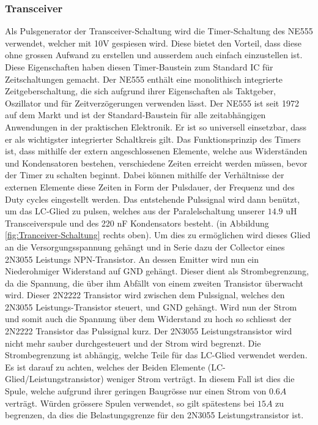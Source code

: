 \subsubsection*{Transceiver}
Als Pulsgenerator der Transceiver-Schaltung wird die Timer-Schaltung des NE555 verwendet, welcher mit 10V gespiesen wird. Diese bietet den Vorteil, dass diese ohne grossen Aufwand zu erstellen und ausserdem auch einfach einzustellen ist. Diese Eigenschaften haben diesen Timer-Baustein zum Standard IC für Zeitschaltungen gemacht. Der NE555 enthält eine monolithisch integrierte Zeitgeberschaltung, die sich aufgrund ihrer Eigenschaften als Taktgeber, Oszillator und für Zeitverzögerungen verwenden lässt. Der NE555 ist seit 1972 auf dem Markt und ist der Standard-Baustein für alle zeitabhängigen Anwendungen in der praktischen Elektronik. Er ist so universell einsetzbar, dass er als wichtigster integrierter Schaltkreis gilt. Das Funktionsprinzip des Timers ist, dass mithilfe der extern angeschlossenen Elemente, welche aus Widerständen und Kondensatoren bestehen, verschiedene Zeiten erreicht werden müssen, bevor der Timer zu schalten beginnt. Dabei können mithilfe der Verhältnisse der externen Elemente diese Zeiten in Form der Pulsdauer, der Frequenz und des Duty cycles eingestellt werden. Das entstehende Pulssignal wird dann benützt, um das LC-Glied zu pulsen, welches aus der Paralelschaltung unserer $14.9$ uH Transceiverspule und des 220 nF Kondensators besteht. (in Abbildung \ref{fig:Tranceiver-Schaltung} rechts oben). Um dies zu ermöglichen wird dieses Glied an die Versorgungsspannung gehängt und in Serie dazu der Collector eines 2N3055 Leistungs NPN-Transistor. An dessen Emitter wird nun ein Niederohmiger Widerstand auf GND gehängt. Dieser dient als Strombegrenzung, da die Spannung, die über ihm Abfällt von einem zweiten Transistor überwacht wird. Dieser 2N2222 Transistor wird zwischen dem Pulssignal, welches den 2N3055 Leistungs-Transistor steuert, und GND gehängt. Wird nun der Strom und somit auch die Spannung über dem Widerstand zu hoch so schliesst der 2N2222 Transistor das Pulssignal kurz. Der 2N3055 Leistungstransistor wird nicht mehr sauber durchgesteuert und der Strom wird begrenzt. Die Strombegrenzung ist abhängig, welche Teile für das LC-Glied verwendet werden. Es ist darauf zu achten, welches der Beiden Elemente (LC-Glied/Leistungstransistor) weniger Strom verträgt. In diesem Fall ist dies die Spule, welche aufgrund ihrer geringen Baugrösse nur einen Strom von $0.6A$ verträgt. Würden grössere Spulen verwendet, so gilt spätestens bei $15A$ zu begrenzen, da dies die Belastungsgrenze für den 2N3055 Leistungstransistor ist.   


